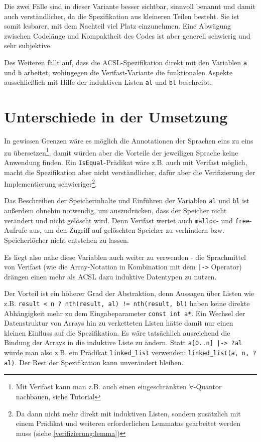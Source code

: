 Die zwei Fälle sind in dieser Variante besser sichtbar, sinnvoll benannt und damit auch verständlicher, 
da die Spezifikation aus kleineren Teilen besteht. Sie ist somit lesbarer, mit dem Nachteil viel Platz einzunehmen.
Eine Abwägung zwischen Codelänge und Kompaktheit des Codes ist aber generell schwierig und sehr subjektive.

Des Weiteren fällt auf, dass die ACSL-Spezifikation direkt mit den Variablen \lstinline{a} und
\lstinline{b} arbeitet, wohingegen die Verifast-Variante die funktionalen Aspekte ausschließlich
mit Hilfe der induktiven Listen \lstinline{al} und \lstinline{bl} beschreibt. 


\section{Unterschiede in der Umsetzung}

In gewissen Grenzen wäre es möglich die Annotationen der Sprachen eins zu eins zu übersetzen\footnote{Mit
Verifast kann man z.B. auch einen eingeschränkten \(\forall\)-Quantor nachbauen, siehe Tutorial\cite[Kap. 17]{jacobs-tutorial}},
damit würden aber die Vorteile der jeweiligen Sprache keine Anwendung finden. Ein \lstinline{IsEqual}-Prädikat wäre z.B.
auch mit Verifast möglich, macht die Spezifikation aber nicht verständlicher, dafür aber die Verifizierung
der Implementierung schwieriger\footnote{Da dann nicht mehr direkt mit induktiven Listen, sondern zusätzlich
mit einem Prädikat und weiteren erforderlichen Lemmatas gearbeitet werden muss (siehe \ref{verifizierung:lemma})}.

Das Beschreiben der Speicherinhalte und Einführen der Variablen  \lstinline{al} und \lstinline{bl} ist außerdem
ohnehin notwendig, um auszudrücken, dass der Speicher nicht verändert und nicht gelöscht wird. Denn Verifast wertet
auch \lstinline{malloc}- und \lstinline{free}-Aufrufe aus, um den Zugriff auf gelöschten Speicher zu verhindern bzw.
Speicherlöcher nicht entstehen zu lassen.

Es liegt also nahe diese Variablen auch weiter zu verwenden - die Sprachmittel von Verifast (wie die Array-Notation in Kombination mit dem
\lstinline{|->} Operator) drängen einen mehr als ACSL dazu induktive Datentypen zu nutzen.

Der Vorteil ist ein höherer Grad der Abstraktion, denn Aussagen über Listen wie z.B.
\lstinline{result < n ? nth(result, al) != nth(result, bl)} haben keine direkte Abhängigkeit mehr zu
dem Eingabeparameter \lstinline{const int a*}. Ein Wechsel der Datenstruktur von Arrays
hin zu verketteten Listen hätte damit nur einen kleinen Einfluss auf die Spezifikation. Es wäre tatsächlich 
ausreichend die Bindung der Arrays in die induktive Liste zu ändern. Statt \lstinline{a[0..n] |-> ?al} würde man also
z.B. ein Prädikat \lstinline{linked_list} verwenden: \lstinline{linked_list(a, n, ?al)}. Der Rest der 
Spezifikation kann unverändert bleiben.

